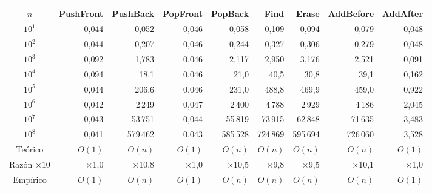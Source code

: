 \begin{tabular}{crrrrrrrr}
\toprule
$n$ & \textbf{PushFront} & \textbf{PushBack} & \textbf{PopFront} & \textbf{PopBack} & \textbf{Find} & \textbf{Erase} & \textbf{AddBefore} & \textbf{AddAfter} \\
\midrule
$10^{1}$ & 0{,}044 & 0{,}052 & 0{,}046 & 0{,}058 & 0{,}109 & 0{,}094 & 0{,}079 & 0{,}048 \\
$10^{2}$ & 0{,}044 & 0{,}207 & 0{,}046 & 0{,}244 & 0{,}327 & 0{,}306 & 0{,}279 & 0{,}048 \\
$10^{3}$ & 0{,}092 & 1{,}783 & 0{,}046 & 2{,}117 & 2{,}950 & 3{,}176 & 2{,}521 & 0{,}091 \\
$10^{4}$ & 0{,}094 & 18{,}1 & 0{,}046 & 21{,}0 & 40{,}5 & 30{,}8 & 39{,}1 & 0{,}162 \\
$10^{5}$ & 0{,}044 & 206{,}6 & 0{,}046 & 231{,}0 & 488{,}8 & 469{,}9 & 459{,}0 & 0{,}922 \\
$10^{6}$ & 0{,}042 & 2\,249 & 0{,}047 & 2\,400 & 4\,788 & 2\,929 & 4\,186 & 2{,}045 \\
$10^{7}$ & 0{,}043 & 53\,751 & 0{,}044 & 55\,819 & 73\,915 & 62\,848 & 71\,635 & 3{,}483 \\
$10^{8}$ & 0{,}041 & 579\,462 & 0{,}043 & 585\,528 & 724\,869 & 595\,694 & 726\,060 & 3{,}528 \\
\midrule
Teórico & $O(1)$ & $O(n)$ & $O(1)$ & $O(n)$ & $O(n)$ & $O(n)$ & $O(n)$ & $O(1)$ \\
Razón $\times 10$ & $\times$1{,}0 & $\times$10{,}8 & $\times$1{,}0 & $\times$10{,}5 & $\times$9{,}8 & $\times$9{,}5 & $\times$10{,}1 & $\times$1{,}0 \\
Empírico & $O(1)$ & $O(n)$ & $O(1)$ & $O(n)$ & $O(n)$ & $O(n)$ & $O(n)$ & $O(1)$ \\
\bottomrule
\end{tabular}